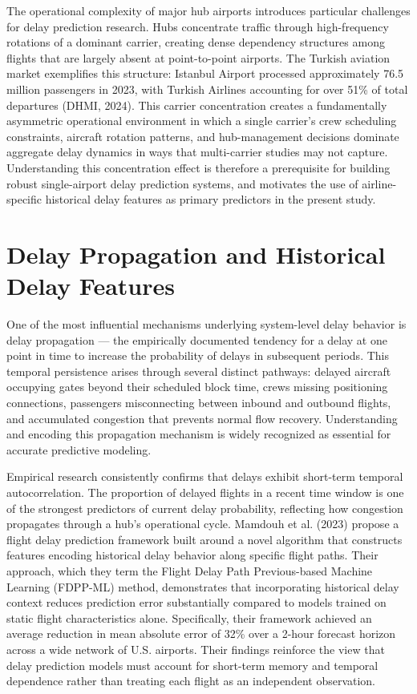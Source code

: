 \documentclass{report}
\begin{document}
The operational complexity of major hub airports introduces particular
challenges for delay prediction research. Hubs concentrate traffic through
high-frequency rotations of a dominant carrier, creating dense dependency
structures among flights that are largely absent at point-to-point airports.
The Turkish aviation market exemplifies this structure: Istanbul Airport
processed approximately 76.5 million passengers in 2023, with Turkish Airlines
accounting for over 51\% of total departures (DHMI, 2024). This carrier
concentration creates a fundamentally asymmetric operational environment in
which a single carrier's crew scheduling constraints, aircraft rotation
patterns, and hub-management decisions dominate aggregate delay dynamics in
ways that multi-carrier studies may not capture. Understanding this
concentration effect is therefore a prerequisite for building robust
single-airport delay prediction systems, and motivates the use of
airline-specific historical delay features as primary predictors in the present
study.





\section{Delay Propagation and Historical Delay Features}

One of the most influential mechanisms underlying system-level delay behavior is delay propagation --- the empirically documented tendency for a delay at one point in time to increase the probability of delays in subsequent periods. This temporal persistence arises through several distinct pathways: delayed aircraft occupying gates beyond their scheduled block time, crews missing positioning connections, passengers misconnecting between inbound and outbound flights, and accumulated congestion that prevents normal flow recovery. Understanding and encoding this propagation mechanism is widely recognized as essential for accurate predictive modeling.

Empirical research consistently confirms that delays exhibit short-term temporal autocorrelation. The proportion of delayed flights in a recent time window is one of the strongest predictors of current delay probability, reflecting how congestion propagates through a hub's operational cycle. Mamdouh et al. (2023) propose a flight delay prediction framework built around a novel algorithm that constructs features encoding historical delay behavior along specific flight paths. Their approach, which they term the Flight Delay Path Previous-based Machine Learning (FDPP-ML) method, demonstrates that incorporating historical delay context reduces prediction error substantially compared to models trained on static flight characteristics alone. Specifically, their framework achieved an average reduction in mean absolute error of 32\% over a 2-hour forecast horizon across a wide network of U.S. airports. Their findings reinforce the view that delay prediction models must account for short-term memory and temporal dependence rather than treating each flight as an independent observation.
\end{document}
